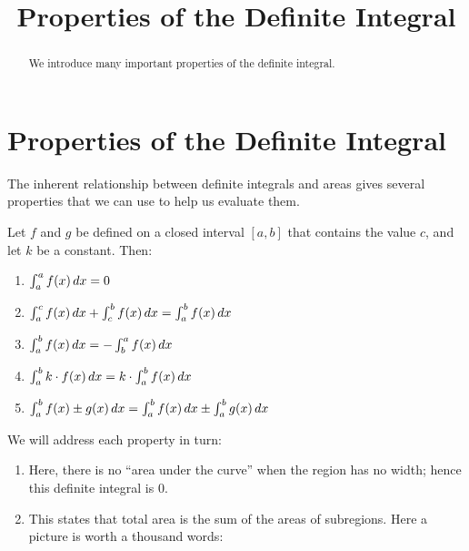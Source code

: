 \documentclass{ximera}
\title{Properties of the Definite Integral}
\begin{document}
\begin{abstract}
  We introduce many important properties of the definite integral.
\end{abstract}
\maketitle

\section{Properties of the Definite Integral}

The inherent relationship between definite integrals and areas gives several properties that we can use
to help us evaluate them.

\begin{theorem}
Let $f$ and $g$ be defined on a closed interval $[a,b]$ that contains the
value $c$, and let $k$ be a constant. Then:
\begin{enumerate}
	\item $\int_a^a f(x)\mathop{}\!d x = 0$
	\item $\int_a^c f(x)\mathop{}\!d x + \int_c^b f(x)\mathop{}\!d x = \int_a^b f(x)\mathop{}\!d x$
	\item $\int_a^bf(x)\mathop{}\!d x = -\int_b^a f(x)\mathop{}\!d x$
	\item $\int_a^bk\cdot f(x)\mathop{}\!d x = k\cdot\int_a^bf(x)\mathop{}\!d x$
	\item $\int_a^b f(x)\pm g(x)\mathop{}\!d x = \int_a^bf(x)\mathop{}\!d x \pm \int_a^bg(x)\mathop{}\!d x$

\end{enumerate}
\begin{explanation}
  We will address each property in turn:
\begin{enumerate}
\item Here, there is no ``area under the curve'' when the region has
  no width; hence this definite integral is $0$.
\item This states that total area is the sum of the areas of
  subregions. Here a picture is worth a thousand words:
  \begin{image}
\end{image}
\end{enumerate}
\end{explanation}
\end{theorem}
\end{document}
